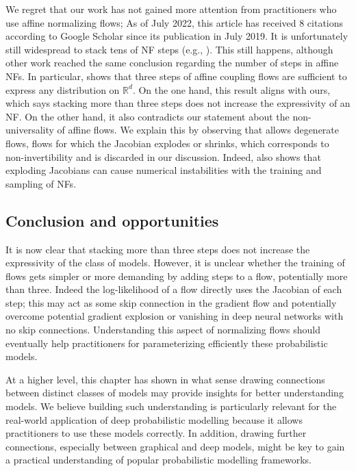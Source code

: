 We regret that our work has not gained more attention from practitioners who use affine normalizing flows; As of July 2022, this article has received 8 citations according to Google Scholar since its publication in July 2019. It is unfortunately still widespread to stack tens of NF steps (e.g., \citep{daxamortized}). This still happens, although other work reached the same conclusion regarding the number of steps in affine NFs. In particular, \citet{koehler2021representational} shows that three steps of affine coupling flows are sufficient to express any distribution on $\mathbb{R}^d$. On the one hand, this result aligns with ours, which says stacking more than three steps does not increase the expressivity of an NF.
On the other hand, it also contradicts our statement about the non-universality of affine flows. We explain this by observing that \citet{koehler2021representational} allows degenerate flows, flows for which the Jacobian explodes or shrinks, which corresponds to non-invertibility and is discarded in our discussion. Indeed, \citet{behrmann2021understanding} also shows that exploding Jacobians can cause numerical instabilities with the training and sampling of NFs.

\subsection{Conclusion and opportunities}
It is now clear that stacking more than three steps does not increase the expressivity of the class of models. However, it is unclear whether the training of flows gets simpler or more demanding by adding steps to a flow, potentially more than three. Indeed the log-likelihood of a flow directly uses the Jacobian of each step; this may act as some skip connection in the gradient flow and potentially overcome potential gradient explosion or vanishing in deep neural networks with no skip connections. Understanding this aspect of normalizing flows should eventually help practitioners for parameterizing efficiently these probabilistic models.

At a higher level, this chapter has shown in what sense drawing connections between distinct classes of models may provide insights for better understanding models. We believe building such understanding is particularly relevant for the real-world application of deep probabilistic modelling because it allows practitioners to use these models correctly. In addition, drawing further connections, especially between graphical and deep models, might be key to gain a practical understanding of popular probabilistic modelling frameworks.
%
